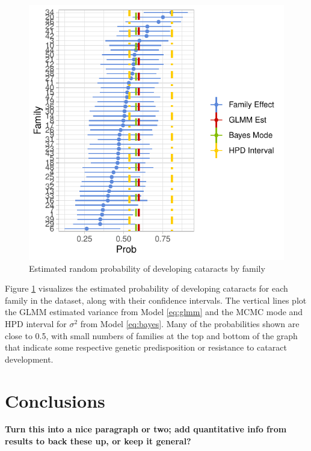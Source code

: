 \documentclass[12pt]{article}
\begin{document}
\begin{figure}[H]

{\centering \includegraphics{bookdown_report_files/figure-latex/re-1} 

}

\caption{Estimated random probability of developing cataracts by family}\label{fig:re}
\end{figure}

Figure \ref{fig:re} visualizes the estimated probability of developing cataracts for each family in the dataset, along with their confidence intervals. The vertical lines plot the GLMM estimated variance from Model \eqref{eq:glmm} and the MCMC mode and HPD interval for \(\sigma^2\) from Model \eqref{eq:bayes}. Many of the probabilities shown are close to 0.5, with small numbers of families at the top and bottom of the graph that indicate some respective genetic predisposition or resistance to cataract development.

\section{Conclusions}
\label{sec:conc}

\textbf{Turn this into a nice paragraph or two; add quantitative info from results to back these up, or keep it general?}
\end{document}
